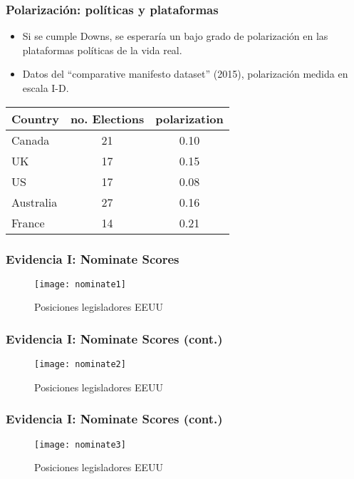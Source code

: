 \documentclass[14pt,aspectratio=169]{beamer}
\begin{document}
\begin{frame}\frametitle{Polarización: políticas y plataformas}
\begin{itemize}
\item Si se cumple Downs, se esperaría un bajo grado de
  polarización en las plataformas políticas de la vida real. 
\item Datos del ``comparative manifesto dataset'' (2015), polarización
  medida en escala I-D. 
\end{itemize}
\begin{table}[htbp]
  \centering
  \begin{tabular}[htbp]{lcc}
    Country	&	no. Elections	&	polarization	\\ \hline
Canada	&	21	&	0.10	\\ \hline
UK	&	17	&	0.15	\\ \hline
US	&	17	&	0.08	\\ \hline
Australia	&	27	&	0.16	\\ \hline
France	&	14	&	0.21	\\ \hline
  \end{tabular}
  \label{tab:3}
\end{table}
\end{frame}



\begin{frame}\frametitle{Evidencia I: Nominate Scores}
  \begin{figure}[htbp]
    \centering
    \texttt{[image: nominate1]}
    \caption{Posiciones legisladores EEUU}
    \label{fig:nominate1}
  \end{figure}
\end{frame}


\begin{frame}\frametitle{Evidencia I: Nominate Scores (cont.)}
  \begin{figure}[htbp]
    \centering
    \texttt{[image: nominate2]}
    \caption{Posiciones legisladores EEUU}
    \label{fig:nominate2}
  \end{figure}
\end{frame}


\begin{frame}\frametitle{Evidencia I: Nominate Scores (cont.)}
  \begin{figure}[htbp]
    \centering
    \texttt{[image: nominate3]}
    \caption{Posiciones legisladores EEUU}
    \label{fig:nominate3}
  \end{figure}
\end{frame}
\end{document}
